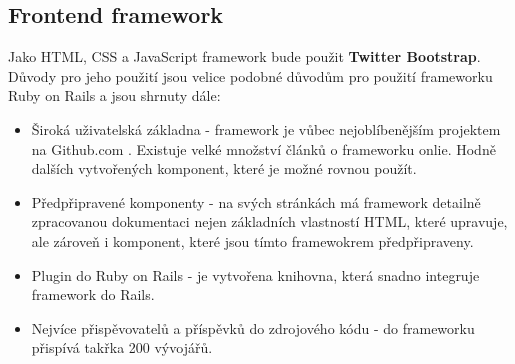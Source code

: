\subsection{Frontend framework}
Jako HTML, CSS a JavaScript framework bude použit \textbf{Twitter Bootstrap}. Důvody pro jeho použití jsou velice podobné důvodům pro použití frameworku Ruby on Rails a jsou shrnuty dále:
\begin{itemize}
\item Široká uživatelská základna - framework je vůbec nejoblíbenějším projektem na Github.com \cite{website:github-popular}. Existuje velké množství článků o frameworku onlie. Hodně dalších vytvořených komponent, které je možné rovnou použít.
\item Předpřipravené komponenty - na svých stránkách má framework detailně zpracovanou dokumentaci nejen základních vlastností HTML, které upravuje, ale zároveň i komponent, které jsou tímto framewokrem předpřipraveny.
\item Plugin do Ruby on Rails - je vytvořena knihovna, která snadno integruje framework do Rails\cite{website:github-bootstrap-saas}.
\item Nejvíce přispěvovatelů a příspěvků do zdrojového kódu - do frameworku přispívá takřka 200 vývojářů.
\end{itemize}
